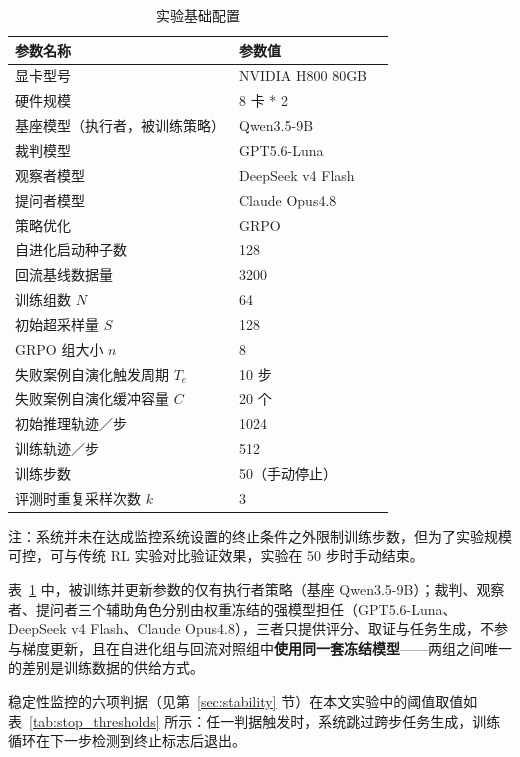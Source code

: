 \begin{table}[htbp]
    \centering
    \caption{实验基础配置}
    \label{tab:config}
    \begin{tabular}{lll}
        \hline
        参数名称 & 参数值 \\
        \hline
        显卡型号 & NVIDIA H800 80GB \\
        硬件规模 & 8 卡 * 2 \\
        基座模型（执行者，被训练策略） & Qwen3.5-9B \\
        裁判模型 & GPT5.6-Luna \\
        观察者模型 & DeepSeek v4 Flash \\
        提问者模型 & Claude Opus4.8 \\
        策略优化 & GRPO \\
        自进化启动种子数 & 128 \\
        回流基线数据量 & 3200 \\
        训练组数 $N$ & 64 \\
        初始超采样量 $S$ & 128 \\
        GRPO 组大小 $n$ & 8 \\
        失败案例自演化触发周期 $T_e$ & 10 步 \\
        失败案例自演化缓冲容量 $C$ & 20 个 \\
        初始推理轨迹／步 & 1024 \\
        训练轨迹／步 & 512 \\
        训练步数 & 50（手动停止）\\
        评测时重复采样次数 $k$ & 3 \\
        \hline
    \end{tabular}
\end{table}

注：系统并未在达成监控系统设置的终止条件之外限制训练步数，但为了实验规模可控，可与传统 RL 实验对比验证效果，实验在 50 步时手动结束。

表~\ref{tab:config} 中，被训练并更新参数的仅有执行者策略（基座 Qwen3.5-9B）；裁判、观察者、提问者三个辅助角色分别由权重冻结的强模型担任（GPT5.6-Luna、DeepSeek v4 Flash、Claude Opus4.8），三者只提供评分、取证与任务生成，不参与梯度更新，且在自进化组与回流对照组中\textbf{使用同一套冻结模型}——两组之间唯一的差别是训练数据的供给方式。

稳定性监控的六项判据（见第~\ref{sec:stability} 节）在本文实验中的阈值取值如表~\ref{tab:stop_thresholds} 所示：任一判据触发时，系统跳过跨步任务生成，训练循环在下一步检测到终止标志后退出。

